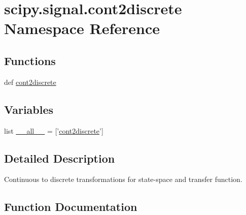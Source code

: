 \hypertarget{namespacescipy_1_1signal_1_1cont2discrete}{}\section{scipy.\+signal.\+cont2discrete Namespace Reference}
\label{namespacescipy_1_1signal_1_1cont2discrete}
\subsection*{Functions}
\begin{DoxyCompactItemize}
\item 
def \hyperlink{namespacescipy_1_1signal_1_1cont2discrete_aa561668fca0655c1c555f20f27646d6a}{cont2discrete}
\end{DoxyCompactItemize}
\subsection*{Variables}
\begin{DoxyCompactItemize}
\item 
list \hyperlink{namespacescipy_1_1signal_1_1cont2discrete_ace13df92f3015de5a92827be014c5c5f}{\+\_\+\+\_\+all\+\_\+\+\_\+} = \mbox{[}'\hyperlink{namespacescipy_1_1signal_1_1cont2discrete_aa561668fca0655c1c555f20f27646d6a}{cont2discrete}'\mbox{]}
\end{DoxyCompactItemize}


\subsection{Detailed Description}
\begin{DoxyVerb}Continuous to discrete transformations for state-space and transfer function.
\end{DoxyVerb}
 

\subsection{Function Documentation}
\hypertarget{namespacescipy_1_1signal_1_1cont2discrete_aa561668fca0655c1c555f20f27646d6a}{}
